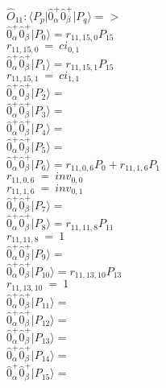 \documentclass[14pt]{article}
\begin{document}
    $\hat{O}_{11}:  \langle{P_p}\vert \hat{0}_{\alpha}^{+}\hat{0}_{\beta}^{+} \vert{P_q}\rangle => $ \\ 
    $ \hat{0}_{\alpha}^{+}\hat{0}_{\beta}^{+} \vert{P_{0}}\rangle = {r}_{11,15,0}P_{15} $ \\ 
    ${r}_{11,15,0}\ =\ {ci}_{0,1} $ \\ 
    $ \hat{0}_{\alpha}^{+}\hat{0}_{\beta}^{+} \vert{P_{1}}\rangle = {r}_{11,15,1}P_{15} $ \\ 
    ${r}_{11,15,1}\ =\ {ci}_{1,1} $ \\ 
    $ \hat{0}_{\alpha}^{+}\hat{0}_{\beta}^{+} \vert{P_{2}}\rangle =  $ \\ 
    $ \hat{0}_{\alpha}^{+}\hat{0}_{\beta}^{+} \vert{P_{3}}\rangle =  $ \\ 
    $ \hat{0}_{\alpha}^{+}\hat{0}_{\beta}^{+} \vert{P_{4}}\rangle =  $ \\ 
    $ \hat{0}_{\alpha}^{+}\hat{0}_{\beta}^{+} \vert{P_{5}}\rangle =  $ \\ 
    $ \hat{0}_{\alpha}^{+}\hat{0}_{\beta}^{+} \vert{P_{6}}\rangle = {r}_{11,0,6}P_{0}+{r}_{11,1,6}P_{1} $ \\ 
    ${r}_{11,0,6}\ =\ {inv}_{0,0} $ \\ 
    ${r}_{11,1,6}\ =\ {inv}_{0,1} $ \\ 
    $ \hat{0}_{\alpha}^{+}\hat{0}_{\beta}^{+} \vert{P_{7}}\rangle =  $ \\ 
    $ \hat{0}_{\alpha}^{+}\hat{0}_{\beta}^{+} \vert{P_{8}}\rangle = {r}_{11,11,8}P_{11} $ \\ 
    ${r}_{11,11,8}\ =\ 1 $ \\ 
    $ \hat{0}_{\alpha}^{+}\hat{0}_{\beta}^{+} \vert{P_{9}}\rangle =  $ \\ 
    $ \hat{0}_{\alpha}^{+}\hat{0}_{\beta}^{+} \vert{P_{10}}\rangle = {r}_{11,13,10}P_{13} $ \\ 
    ${r}_{11,13,10}\ =\ 1 $ \\ 
    $ \hat{0}_{\alpha}^{+}\hat{0}_{\beta}^{+} \vert{P_{11}}\rangle =  $ \\ 
    $ \hat{0}_{\alpha}^{+}\hat{0}_{\beta}^{+} \vert{P_{12}}\rangle =  $ \\ 
    $ \hat{0}_{\alpha}^{+}\hat{0}_{\beta}^{+} \vert{P_{13}}\rangle =  $ \\ 
    $ \hat{0}_{\alpha}^{+}\hat{0}_{\beta}^{+} \vert{P_{14}}\rangle =  $ \\ 
    $ \hat{0}_{\alpha}^{+}\hat{0}_{\beta}^{+} \vert{P_{15}}\rangle =  $ \\ 
    
\end{document}
